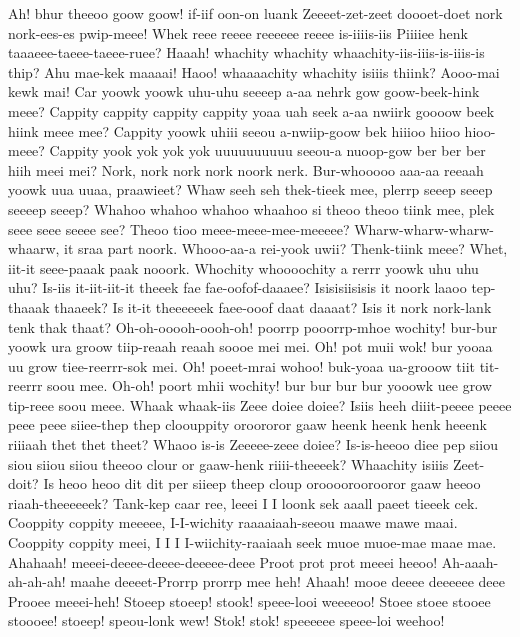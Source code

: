 \documentclass[12pt,a4paper]{article}
\begin{document}
\begin{drama}
\promspeaks
Ah! bhur theeoo goow goow! if-iif oon-on luank Zeeeet-zet-zeet doooet-doet nork nork-ees-es pwip-meee! Whek reee reeee reeeeee reeee is-iiiis-iis Piiiiee henk taaaeee-taeee-taeee-ruee?
\pistspeaks
Haaah! whachity whachity whaachity-iis-iiis-is-iiis-is thip? Ahu mae-kek maaaai! Haoo! whaaaachity whachity isiiis thiink? Aooo-mai kewk mai!
\promspeaks
Car yoowk yoowk uhu-uhu seeeep a-aa nehrk gow goow-beek-hink meee? Cappity cappity cappity cappity yoaa uah seek a-aa nwiirk goooow beek hiink meee mee? Cappity yoowk uhiii seeou a-nwiip-goow bek hiiioo hiioo hioo-meee? Cappity yook yok yok yok uuuuuuuuuu seeou-a nuoop-gow ber ber ber hiih meei mei?
\pistspeaks
Nork, nork nork nork noork nerk. Bur-whooooo aaa-aa reeaah yoowk uua uuaa, praawieet?
\promspeaks
Whaw seeh seh thek-tieek mee, plerrp seeep seeep seeeep seeep? Whahoo whahoo whahoo whaahoo si theoo theoo tiink mee, plek seee seee seeee see?
\pistspeaks
Theoo tioo meee-meee-mee-meeeee? Wharw-wharw-wharw-whaarw, it sraa part noork. Whooo-aa-a rei-yook uwii? Thenk-tiink meee? Whet, iit-it seee-paaak paak nooork. Whochity whoooochity a rerrr yoowk uhu uhu uhu?
\promspeaks
Is-iis it-iit-iit-it theeek fae fae-oofof-daaaee? Isisisiisisis it noork laaoo tep-thaaak thaaeek? Is it-it theeeeeek faee-ooof daat daaaat? Isis it nork nork-lank tenk thak thaat?
\pistspeaks
Oh-oh-ooooh-oooh-oh! poorrp pooorrp-mhoe wochity! bur-bur yoowk ura groow tiip-reaah reaah soooe mei mei. Oh! pot muii wok! bur yooaa uu grow tiee-reerrr-sok mei. Oh! poeet-mrai wohoo! buk-yoaa ua-grooow tiit tit-reerrr soou mee. Oh-oh! poort mhii wochity! bur bur bur bur yooowk uee grow tip-reee soou meee.
\promspeaks
Whaak whaak-iis Zeee doiee doiee? Isiis heeh diiit-peeee peeee peee peee siiee-thep thep cloouppity oroororor gaaw heenk heenk henk heeenk riiiaah thet thet theet? Whaoo is-is Zeeeee-zeee doiee? Is-is-heeoo diee pep siiou siou siiou siiou theeoo clour or gaaw-henk riiii-theeeek? Whaachity isiiis Zeet-doit? Is heoo heoo dit dit per siieep theep cloup orooooroorooror gaaw heeoo riaah-theeeeeek?
\pistspeaks
Tank-kep caar ree, leeei I I loonk sek aaall paeet tieeek cek.
\promspeaks
Cooppity coppity meeeee, I-I-wichity raaaaiaah-seeou maawe mawe maai. Cooppity coppity meei, I I I I-wiichity-raaiaah seek muoe muoe-mae maae mae.
\pistspeaks
Ahahaah! meeei-deeee-deeee-deeeee-deee Proot prot prot meeei heeoo! Ah-aaah-ah-ah-ah! maahe deeeet-Prorrp prorrp mee heh! Ahaah! mooe deeee deeeeee deee Prooee meeei-heh!
\promspeaks
Stoeep stoeep! stook! speee-looi weeeeoo! Stoee stoee stooee stoooee! stoeep! speou-lonk wew! Stok! stok! speeeeee speee-loi weehoo!

\end{drama}
\end{document}
